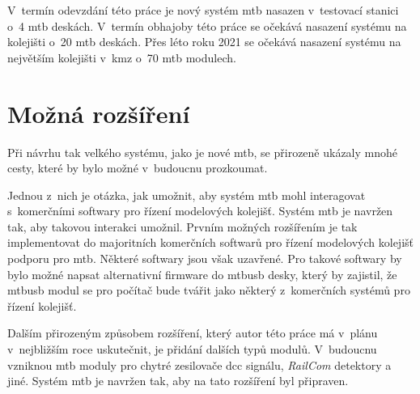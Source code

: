 V~termín odevzdání této práce je nový systém \gls{mtb} nasazen v~testovací
stanici o~4 \gls{mtb} deskách. V~termín obhajoby této práce se očekává nasazení
systému na kolejišti o~20 \gls{mtb} deskách. Přes léto roku 2021 se očekává
nasazení systému na největším kolejišti v~\gls{kmz} o~70 \gls{mtb} modulech.

\section{Možná rozšíření} \label{sec:future}

Při návrhu tak velkého systému, jako je nové \gls{mtb}, se přirozeně ukázaly
mnohé cesty, které by bylo možné v~budoucnu prozkoumat.

Jednou z~nich je otázka, jak umožnit, aby systém \gls{mtb} mohl interagovat
s~komerčními softwary pro řízení modelových kolejišť. Systém \gls{mtb} je navržen
tak, aby takovou interakci umožnil. Prvním možných rozšířením je tak implementovat
do majoritních komerčních softwarů pro řízení modelových kolejišť podporu
pro \gls{mtb}. Některé softwary jsou však uzavřené. Pro takové softwary by bylo
možné napsat alternativní firmware do \gls{mtbusb} desky, který by zajistil, že
\gls{mtbusb} modul se pro počítač bude tvářit jako některý z~komerčních systémů
pro řízení kolejišť.

Dalším přirozeným způsobem rozšíření, který autor této práce má v~plánu
v~nejbližším roce uskutečnit, je přidání dalších typů modulů. V~budoucnu
vzniknou \gls{mtb} moduly pro chytré zesilovače \gls{dcc} signálu,
\textit{RailCom} detektory a jiné. Systém \gls{mtb} je navržen tak, aby na tato
rozšíření byl připraven.
